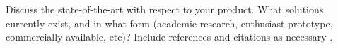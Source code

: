 Discuss the state-of-the-art with respect to your product. What solutions currently exist, and in what form (academic research, enthusiast prototype, commercially available, etc)? Include references and citations as necessary \cite{Rubin2012}.